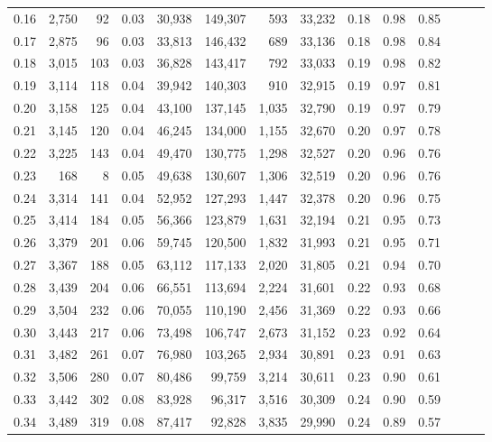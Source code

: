 \begin{tabular}{rrrrrrrrrrrrrr}
0.16 &  2,750 &   92 &  0.03 &   30,938 &  149,307 &     593 &  33,232 &  0.18 &  0.98 &      0.85 \\
0.17 &  2,875 &   96 &  0.03 &   33,813 &  146,432 &     689 &  33,136 &  0.18 &  0.98 &      0.84 \\
0.18 &  3,015 &  103 &  0.03 &   36,828 &  143,417 &     792 &  33,033 &  0.19 &  0.98 &      0.82 \\
0.19 &  3,114 &  118 &  0.04 &   39,942 &  140,303 &     910 &  32,915 &  0.19 &  0.97 &      0.81 \\
0.20 &  3,158 &  125 &  0.04 &   43,100 &  137,145 &   1,035 &  32,790 &  0.19 &  0.97 &      0.79 \\
0.21 &  3,145 &  120 &  0.04 &   46,245 &  134,000 &   1,155 &  32,670 &  0.20 &  0.97 &      0.78 \\
0.22 &  3,225 &  143 &  0.04 &   49,470 &  130,775 &   1,298 &  32,527 &  0.20 &  0.96 &      0.76 \\
0.23 &    168 &    8 &  0.05 &   49,638 &  130,607 &   1,306 &  32,519 &  0.20 &  0.96 &      0.76 \\
0.24 &  3,314 &  141 &  0.04 &   52,952 &  127,293 &   1,447 &  32,378 &  0.20 &  0.96 &      0.75 \\
0.25 &  3,414 &  184 &  0.05 &   56,366 &  123,879 &   1,631 &  32,194 &  0.21 &  0.95 &      0.73 \\
0.26 &  3,379 &  201 &  0.06 &   59,745 &  120,500 &   1,832 &  31,993 &  0.21 &  0.95 &      0.71 \\
0.27 &  3,367 &  188 &  0.05 &   63,112 &  117,133 &   2,020 &  31,805 &  0.21 &  0.94 &      0.70 \\
0.28 &  3,439 &  204 &  0.06 &   66,551 &  113,694 &   2,224 &  31,601 &  0.22 &  0.93 &      0.68 \\
0.29 &  3,504 &  232 &  0.06 &   70,055 &  110,190 &   2,456 &  31,369 &  0.22 &  0.93 &      0.66 \\
0.30 &  3,443 &  217 &  0.06 &   73,498 &  106,747 &   2,673 &  31,152 &  0.23 &  0.92 &      0.64 \\
0.31 &  3,482 &  261 &  0.07 &   76,980 &  103,265 &   2,934 &  30,891 &  0.23 &  0.91 &      0.63 \\
0.32 &  3,506 &  280 &  0.07 &   80,486 &   99,759 &   3,214 &  30,611 &  0.23 &  0.90 &      0.61 \\
0.33 &  3,442 &  302 &  0.08 &   83,928 &   96,317 &   3,516 &  30,309 &  0.24 &  0.90 &      0.59 \\
0.34 &  3,489 &  319 &  0.08 &   87,417 &   92,828 &   3,835 &  29,990 &  0.24 &  0.89 &      0.57 \\

\end{tabular}
